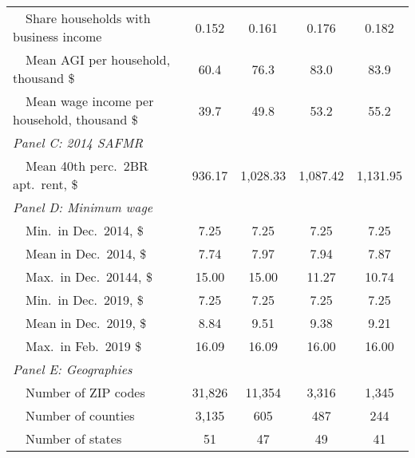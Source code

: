 \begin{landscape}
\begin{table}[hbt!]
\begin{tabular}{@{}lcccc@{}}
        $\quad$Share households with business income        & 0.152    & 0.161   & 0.176   & 0.182          \\
        $\quad$Mean AGI per household, thousand \$          & 60.4 & 76.3 & 83.0 & 83.9     \\
        $\quad$Mean wage income per household, thousand \$  & 39.7 & 49.8 & 53.2 & 55.2     \\
        \textit{Panel C: 2014 SAFMR}                        &       &       &        &               \\
        $\quad$Mean 40th perc.\ 2BR apt.\ rent, \$          & 936.17   & 1,028.33  & 1,087.42  & 1,131.95          \\
        \textit{Panel D: Minimum wage}                      &       &       &        &              \\
        $\quad$Min.\ in Dec.\ 2014, \$                      & 7.25   & 7.25  & 7.25  & 7.25         \\
        $\quad$Mean in Dec.\ 2014, \$                       & 7.74   & 7.97  & 7.94  & 7.87         \\
        $\quad$Max.\ in Dec.\ 20144, \$                     & 15.00   & 15.00  & 11.27  & 10.74         \\
        $\quad$Min.\ in Dec.\ 2019, \$                      & 7.25   & 7.25  & 7.25  & 7.25         \\
        $\quad$Mean in Dec.\ 2019, \$                       & 8.84   & 9.51  & 9.38  & 9.21         \\
        $\quad$Max.\ in Feb.\ 2019 \$                       & 16.09   & 16.09  & 16.00  & 16.00         \\
        \textit{Panel E: Geographies}                       &       &       &        &               \\
        $\quad$Number of ZIP codes                          & 31,826  & 11,354 & 3,316 & 1,345             \\
        $\quad$Number of counties                           & 3,135  & 605 & 487 & 244             \\
        $\quad$Number of states                             & 51  & 47 & 49 & 41             \\ \bottomrule
    \end{tabular}


\end{table}
\end{landscape}
